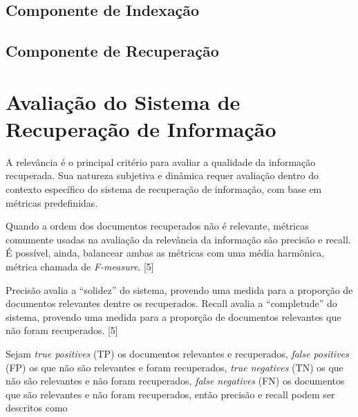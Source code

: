 \documentclass[
	12pt,				%
	openright,			%
	oneside,			%
	a4paper,			%
	english,			%
	french,				%
	spanish,			%
	brazil				%
	]{abntex2}
\begin{document}
\subsection{Componente de Indexação}\label{subsec:componente-de-indexação}


\subsection{Componente de Recuperação}\label{subsec:componente-de-recuperação}


\section{Avaliação do Sistema de Recuperação de Informação}\label{sec:avaliacao-do-sistema-de-recuperacao-de-informacao}



A relevância é o principal critério para avaliar a qualidade da informação recuperada.
Sua natureza subjetiva e dinâmica requer avaliação dentro do contexto específico do sistema de recuperação de informação,
com base em métricas predefinidas.

Quando a ordem dos documentos recuperados não é relevante, métricas comumente usadas na avaliação da relevância da
informação são precisão e recall.
É possível, ainda, balancear ambas as métricas com uma média harmônica, métrica chamada de \textit{F-measure}.
[5]

Precisão avalia a ``solidez'' do sistema, provendo uma medida para a proporção de documentos relevantes dentre os
recuperados.
Recall avalia a ``completude'' do sistema, provendo uma medida para a proporção de documentos relevantes que não
foram recuperados.
[5]

Sejam \textit{true positives} (TP) os documentos relevantes e recuperados,
\textit{false positives} (FP) os que não são relevantes e foram recuperados,
\textit{true negatives} (TN) os que não são relevantes e não foram recuperados,
\textit{false negatives} (FN) os documentos que são relevantes e não foram recuperados,
então precisão e recall podem ser descritos como
\end{document}
